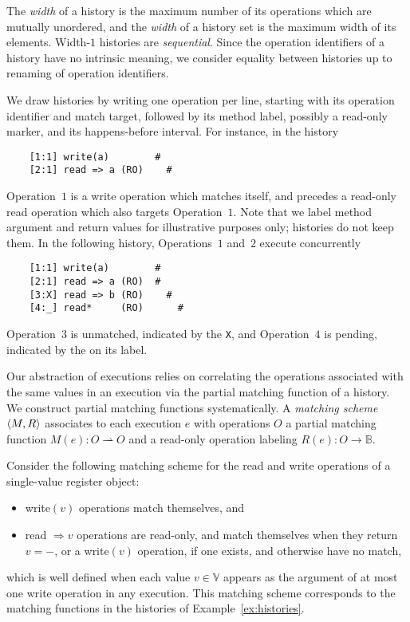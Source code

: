 The \emph{width} of a history is the maximum number of its operations which are
mutually unordered, and the \emph{width} of a history set is the maximum width
of its elements. Width-$1$ histories are \emph{sequential}. Since the operation
identifiers of a history have no intrinsic meaning, we consider equality between
histories up to renaming of operation identifiers.

\begin{example}
  \label{ex:histories}

  We draw histories by writing one operation per line, starting with its
  operation identifier and match target, followed by its method label,
  possibly a read-only marker, and its happens-before interval. For instance,
  in the history
\begin{verbatim}
    [1:1] write(a)        #
    [2:1] read => a (RO)    #
\end{verbatim}
  Operation~$1$ is a write operation which matches itself, and precedes a
  read-only read operation which also targets Operation~$1$. Note that we
  label method argument and return values for illustrative purposes only;
  histories do not keep them. In the following history, Operations~$1$ and~$2$
  execute concurrently
\begin{verbatim}
    [1:1] write(a)        #
    [2:1] read => a (RO)  #
    [3:X] read => b (RO)    #
    [4:_] read*     (RO)      #
\end{verbatim}
  Operation~$3$ is unmatched, indicated by the {\tt X}, and Operation~$4$ is
  pending, indicated by the {\tt *} on its label.

\end{example}

Our abstraction of executions relies on correlating the operations associated
with the same values in an execution via the partial matching function of a
history. We construct partial matching functions systematically. A
\emph{matching scheme} ${\left\langle{M,R}\right\rangle}$ associates to each execution $e$ with
operations $O$ a partial matching function $M(e): O \rightharpoonup O$ and a
read-only operation labeling $R(e): O \to \mathbb{B}$.

\begin{example}
  \label{ex:matching}

  Consider the following matching scheme for the read and write operations of
  a single-value register object:
  \begin{itemize}

    \item write$(v)$ operations match themselves, and

    \item read $\Rightarrow v$ operations are read-only, and match themselves
    when they return $v = -$, or a write$(v)$ operation, if one
    exists, and otherwise have no match,

  \end{itemize}
  which is well defined when each value $v \in \mathbb{V}$ appears as the
  argument of at most one write operation in any execution. This matching
  scheme corresponds to the matching functions in the histories of
  Example~\ref{ex:histories}.

\end{example}

